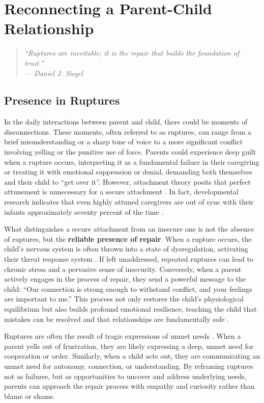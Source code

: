 \chapter{Reconnecting a Parent-Child Relationship}

\begin{quote}
\itshape ``Ruptures are inevitable; it is the repair that builds the foundation of trust.''\\
\upshape --- Daniel J. Siegel
\end{quote}

\newpage
\section{Presence in Ruptures}

In the daily interactions between parent and child, there could be moments of disconnections.
These moments, often referred to as ruptures, can range from a brief misunderstanding or a sharp tone of voice to a more significant conflict involving yelling or the punitive use of force.
Parents could experience deep guilt when a rupture occurs, interpreting it as a fundamental failure in their caregiving or treating it with emotional suppression or denial, demanding both themselves and their child to ``get over it''.
However, attachment theory posits that perfect attunement is unnecessary for a secure attachment \citep{sroufe2005}.
In fact, developmental research indicates that even highly attuned caregivers are out of sync with their infants approximately seventy percent of the time \citep{schore2001}.

What distinguishes a secure attachment from an insecure one is not the absence of ruptures, but the \textbf{reliable presence of repair}.
When a rupture occurs, the child's nervous system is often thrown into a state of dysregulation, activating their threat response system \citep{porges2011}.
If left unaddressed, repeated ruptures can lead to chronic stress and a pervasive sense of insecurity.
Conversely, when a parent actively engages in the process of repair, they send a powerful message to the child: ``Our connection is strong enough to withstand conflict, and your feelings are important to me.''
This process not only restores the child's physiological equilibrium but also builds profound emotional resilience, teaching the child that mistakes can be resolved and that relationships are fundamentally safe \citep{siegel2011}.

Ruptures are often the result of tragic expressions of unmet needs \citep{rosenberg2003}.
When a parent yells out of frustration, they are likely expressing a deep, unmet need for cooperation or order.
Similarly, when a child acts out, they are communicating an unmet need for autonomy, connection, or understanding.
By reframing ruptures not as failures, but as opportunities to uncover and address underlying needs, parents can approach the repair process with empathy and curiosity rather than blame or shame.

